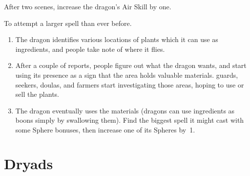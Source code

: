 \begin{multicols}{2}
\begin{dlist}
  After two scenes, increase the dragon's Air Skill by one.
  \item
  To attempt a larger spell than ever before.
  \begin{enumerate}
    \item
    The dragon identifies various locations of plants which it can use as \glspl{ingredient}, and people take note of where it flies.
    \item
    After a couple of reports, people figure out what the dragon wants, and start using its presence as a sign that the area holds valuable materials.
    \Glspl{guard}, \glspl{seeker}, \glspl{doula}, and farmers start investigating those areas, hoping to use or sell the plants.
    \item
    The dragon eventually uses the materials (dragons can use \glspl{ingredient} as \glspl{boon} simply by swallowing them).
    Find the biggest spell it might cast with some Sphere bonuses, then increase one of its Spheres by~1.
  \end{enumerate}
\end{dlist}

\end{multicols}

\section[Dryad]{Dryads}
\label{dryad}


